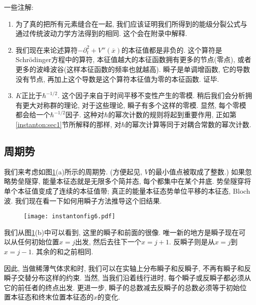 一些注解:
\begin{enumerate}
    \item 为了真的把所有元素缝合在一起, 我们应该证明我们所得到的能级分裂公式与通过传统波动力学方法得到的相同. 这个会在附录中解释.
    \item 我们现在来论述算符$-\partial_{t}^{2}+V''(\overline{x})$的本征值都是非负的. 这个算符是Schr\"{o}dinger方程中的算符, 本征值越大的本征函数拥有更多的节点(零点), 或者更多的波峰波谷(这样本征函数的频率也就越高). 瞬子是单调增函数, 它的导数没有节点, 再加上这个导数是这个算符本征值为零的本征函数. 证毕.
    \item $K$正比于$\hbar^{-1/2}$. 这个因子来自于时间平移不变性产生的零模. 稍后我们会分析拥有更大对称群的理论, 对于这些理论, 瞬子有多个这样的零模. 显然, 每个零模都会给一个$\hbar^{-1/2}$因子. 这种对$\hbar$的幂次计数的规则将起到重要作用, 正如第\ref{instanton:sec1}节所解释的那样, 对$\hbar$的幂次计算等同于对耦合常数的幂次计数.
\end{enumerate}

\subsection{周期势}

我们来考虑如图\ref{instantonfig6}(a)所示的周期势. (方便起见, $V$的最小值点被取成了整数.) 如果忽略势垒隧穿, 能量本征态就是无限多个简并态, 每个都集中在某个井底. 
势垒隧穿将单个本征值变成了连续的本征值带; 真正的能量本征态势单位平移的本征态, Bloch波. 我们现在看一下如何用瞬子方法推导这个旧结果.
\begin{figure}[h]
    \centering
    \texttt{[image: instantonfig6.pdf]}
    \caption{ \label{instantonfig6}}
  \end{figure}

我们从图\ref{instantonfig6}(b)中可以看到, 这里的瞬子和前面的很像. 唯一新的地方是瞬子现在可以从任何初始位置$x=j$出发, 然后去往下一个$x=j+1$. 反瞬子则是从$x=j$到$x=j-1$. 
其余的和之前相同.

因此, 当做稀薄气体求和时, 我们可以在实轴上分布瞬子和反瞬子, 不再有瞬子和反瞬子交替分布这样的约束. 当然, 当我们沿着线行进时, 
每个瞬子或反瞬子都必须从它的前任者的终点出发. 更进一步, 瞬子的总数减去反瞬子的总数必须等于初始位置本征态和终末位置本征态的$x$的变化.

